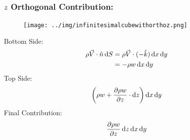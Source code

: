 \documentclass[class=report, crop=false, 12pt,a4paper]{standalone}
\begin{document}
\subsubsection{$z$ Orthogonal Contribution:}
\begin{figure}[H]
  \centering
  \texttt{[image: ../img/infinitesimalcubewithorthoz.png]}
\end{figure}
Bottom Side:
\begin{align}
  \rho \vec{V} \cdot \hat{n} \dif S &= \rho \vec{V} \cdot (- \hat{k}) \dif x \dif y\\
  &= -\rho w \dif x \dif y
\end{align}
Top Side:
\begin{gather}
  \left(\rho w + \frac{\partial \rho w}{\partial z} \cdot \dif z \right) \dif x \dif y
\end{gather}
Final Contribution:
\begin{gather}
  \frac{\partial \rho w}{\partial z} \dif z \dif x \dif y 
  \label{zorthogonalcontribution}
\end{gather}
\end{document}
